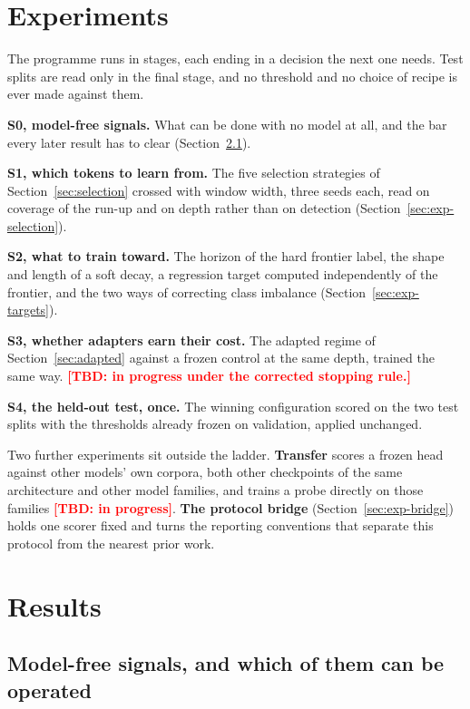 \documentclass{article}
\newcommand{\TBD}[1]{\textcolor{red}{\textbf{[TBD: #1]}}}
\begin{document}
\section{Experiments}
\label{sec:experiments}

The programme runs in stages, each ending in a decision the next one needs. Test
splits are read only in the final stage, and no threshold and no choice of recipe
is ever made against them.

\textbf{S0, model-free signals.} What can be done with no model at all, and the
bar every later result has to clear (Section~\ref{sec:exp-baselines}).

\textbf{S1, which tokens to learn from.} The five selection strategies of
Section~\ref{sec:selection} crossed with window width, three seeds each, read on
coverage of the run-up and on depth rather than on detection
(Section~\ref{sec:exp-selection}).

\textbf{S2, what to train toward.} The horizon of the hard frontier label, the
shape and length of a soft decay, a regression target computed independently of
the frontier, and the two ways of correcting class imbalance
(Section~\ref{sec:exp-targets}).

\textbf{S3, whether adapters earn their cost.} The adapted regime of
Section~\ref{sec:adapted} against a frozen control at the same depth, trained the
same way. \TBD{in progress under the corrected stopping rule.}

\textbf{S4, the held-out test, once.} The winning configuration scored on the two
test splits with the thresholds already frozen on validation, applied unchanged.

Two further experiments sit outside the ladder. \textbf{Transfer} scores a frozen
head against other models' own corpora, both other checkpoints of the same
architecture and other model families, and trains a probe directly on those
families \TBD{in progress}. \textbf{The protocol bridge}
(Section~\ref{sec:exp-bridge}) holds one scorer fixed and turns the reporting
conventions that separate this protocol from the nearest prior work.

\section{Results}
\label{sec:results}

\subsection{Model-free signals, and which of them can be operated}
\label{sec:exp-baselines}
\end{document}
